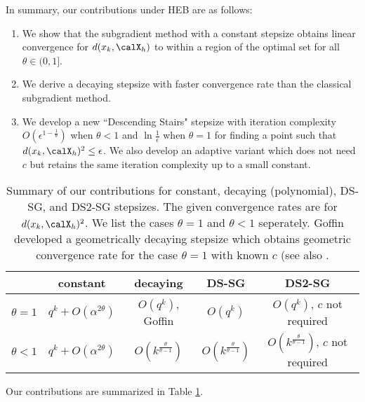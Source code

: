 \documentclass[smallextended]{svjour3}
\begin{document}
In summary, our contributions under HEB are as follows: 
\begin{enumerate}
\item We show that the subgradient method with a constant stepsize obtains linear convergence for $d(x_k,\calX_h)$ to within a region of the optimal set for all $\theta\in(0,1]$. 
\item We derive a decaying stepsize with faster convergence rate than the classical subgradient method.
\item We develop a new ``Descending Stairs" stepsize with iteration complexity $O(\epsilon^{1-\frac{1}{\theta}})$ when $\theta<1$ and $\ln\frac{1}{\epsilon}$ when $\theta=1$ for finding a point such that $d(x_k,\calX_h)^2\leq\epsilon$. We also develop an adaptive variant which does not need $c$ but retains the same iteration complexity up to a small constant. 
\end{enumerate}
 \begin{table}
  	\caption{Summary of our contributions for constant, decaying (polynomial), DS-SG, and DS2-SG stepsizes. The given convergence rates are for $d(x_k,\calX_h)^2$. We list the cases $\theta=1$ and $\theta<1$ seperately. Goffin \cite{goffin1977convergence} developed a geometrically decaying stepsize which obtains geometric convergence rate for the case $\theta=1$ with known $c$ (see also \cite[Sec. 2.3]{shor2012minimization}.}\label{tableux}
  	\begin{tabular}{|c||c|c|c|c|}
  		\hline
    &constant& decaying & DS-SG & DS2-SG\\		
    \hline
  	$\theta=1$& $q^k+O(\alpha^{2\theta})$ & $O(q^k)$, Goffin \cite{goffin1977convergence}&$O(q^k)$&$O(q^k)$, $c$ not required\\[2ex]
  	\hline 
  	$\theta<1$ & $q^k+O(\alpha^{2\theta})$ & $O\left(k^{\frac{\theta}{\theta-1}}\right)$ 
  	&$O\left(k^{\frac{\theta}{\theta-1}}\right)$ & $O\left(k^{\frac{\theta}{\theta-1}}\right)$, $c$ not required
  	\\[2ex]
  	\hline
  	\end{tabular}
  	
  \end{table}
  Our contributions are summarized in Table \ref{tableux}.
  
\end{document}
